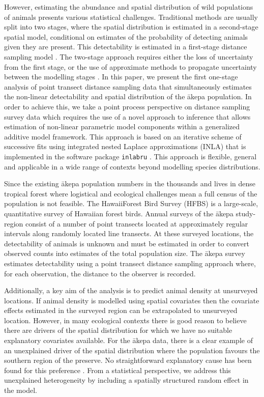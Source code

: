 \documentclass{statsoc}
\newcommand{\akepa}{\textquotesingle\={a}kepa}  %
\newcommand{\hawaii}{Hawai\textquotesingle i}   %
\begin{document}
However, estimating the abundance and spatial distribution of wild populations of animals presents various statistical challenges. Traditional methods are usually split into two stages, where the spatial distribution is estimated in a second-stage spatial model, conditional on estimates of the probability of detecting animals given they are present.  This detectability is estimated in a first-stage distance sampling model \citep{millerExtendingDensitySurface2021, miller_spatial_2013}.  The two-stage approach requires either the loss of uncertainty from the first stage, or the use of approximate methods to propagate uncertainty between the modelling stages \citep{bravington_VariancePropagationDensity_2021}.  In this paper, we present the first one-stage analysis of point transect distance sampling data that simultaneously estimates the non-linear detectability and spatial distribution of the \akepa{} population.  In order to achieve this, we take a point process perspective on distance sampling survey data which requires the use of a novel approach to inference that allows estimation of non-linear parametric model components within a generalized additive model framework. This approach is based on an iterative scheme of successive fits using integrated nested Laplace approximations (INLA) \citep{rue_approximate_2009} that is implemented in the software package \texttt{inlabru} \citep{lindgren_inlabru_2024}.  This approach is flexible, general and applicable in a wide range of contexts beyond modelling species distributions.

Since the existing \akepa{} population numbers in the thousands and lives in dense tropical forest where logistical and ecological challenges mean a full census of the population is not feasible. The \hawaii Forest Bird Survey (HFBS) \citep{scott_HFBS_1986} is a large-scale, quantitative survey of Hawaiian forest birds.  Annual surveys of the \akepa{} study-region consist of a number of point transects located at approximately regular intervals along randomly located line transects.  At these surveyed locations, the detectability of animals is unknown and must be estimated in order to convert observed counts into estimates of the total population size.  The \akepa{} survey estimates detectability using a point transect distance sampling approach \citep{buckland_distance_2015} where, for each observation, the distance to the observer is recorded. 

Additionally, a key aim of the analysis is to predict animal density at unsurveyed locations.  If animal density is modelled using spatial covariates then the covariate effects estimated in the surveyed region can be extrapolated to unsurveyed location.  However, in many ecological contexts there is good reason to believe there are drivers of the spatial distribution for which we have no suitable explanatory covariates available. For the \akepa{} data, there is a clear example of an unexplained driver of the spatial distribution where the population favours the southern region of the preserve.  No straightforward explanatory cause has been found for this preference \citep{camp_dsm_2020}.  From a statistical perspective, we address this unexplained heterogeneity by including a spatially structured random effect in the model.  
\end{document}
